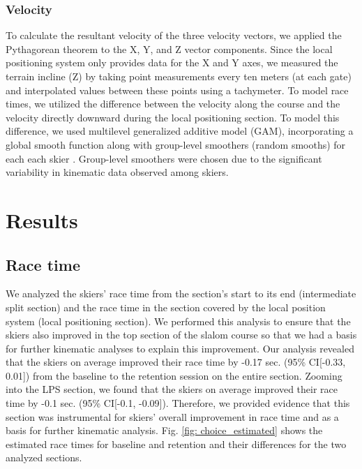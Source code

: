 \documentclass{article}
\begin{document}
\subsubsection{Velocity}
To calculate the resultant velocity of the three velocity vectors, we applied the Pythagorean theorem to the X, Y, and Z vector components. Since the local positioning system only provides data for the X and Y axes, we measured the terrain incline (Z) by taking point measurements every ten meters (at each gate) and interpolated values between these points using a tachymeter. To model race times, we utilized the difference between the velocity along the course and the velocity directly downward during the local positioning section. To model this difference, we used multilevel generalized additive model (GAM), incorporating a global smooth function along with group-level smoothers (random smooths) for each each skier \cite{pedersen_hierarchical_2019}. Group-level smoothers were chosen due to the significant variability in kinematic data observed among skiers.

 

\section{Results}



\subsection{Race time}
We analyzed the skiers' race time from the section's start to its end (intermediate split section) and the race time in the section covered by the local position system (local positioning section). We performed this analysis to ensure that the skiers also improved in the top section of the slalom course so that we had a basis for further kinematic analyses to explain this improvement. Our analysis revealed that the skiers on average improved their race time by -0.17 sec. (95\% CI[-0.33, 0.01]) from the baseline to the retention session on the entire section. Zooming into the LPS section, we found that the skiers on average improved their race time by -0.1 sec. (95\% CI[-0.1, -0.09]). Therefore, we provided evidence that this section was instrumental for skiers’ overall improvement in race time and as a basis for further kinematic analysis. Fig. \ref{fig: choice_estimated} shows the estimated race times for baseline and retention and their differences for the two analyzed sections. 
\end{document}
